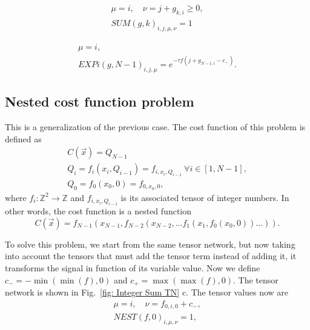 \begin{equation}
     \begin{gathered}
         \mu=i,\quad \nu=j+g_{k,i}\geq 0,\\
         SUM(g,k)_{i,j,\mu,\nu} = 1
     \end{gathered}
\end{equation}

\begin{equation}
     \begin{gathered}
         \mu=i,\\
         EXPi(g,N-1)_{i,j,\mu} = e^{-\tau f(j+g_{N-1,i}-c_-)}.
     \end{gathered}
\end{equation}


\subsection{Nested cost function problem}
This is a generalization of the previous case. The cost function of this problem is defined as
\begin{equation}
    \begin{gathered}
        C(\vec{x})=Q_{N-1}\\
        Q_i = f_i(x_i,Q_{i-1})=f_{i,x_i,Q_{i-1}}\ \forall i\in[1,N-1],\\
        Q_0 = f_0(x_0,0)=f_{0,x_0,0},
    \end{gathered}
\end{equation}
where $f_i: \mathbb{Z}^2\rightarrow \mathbb{Z}$ and $f_{i,x_i,Q_{i-1}}$ is its associated tensor of integer numbers. In other words, the cost function is a nested function
\begin{equation}
    C(\vec{x})=f_{N-1}(x_{N-1},f_{N-2}(x_{N-2},\dots f_{1}(x_{1},f_0(x_0,0))\dots)).
\end{equation}

To solve this problem, we start from the same tensor network, but now taking into account the tensors that must add the tensor term instead of adding it, it transforms the signal in function of its variable value. Now we define  $c_-=-\min(\min(f),0)$ and $c_+=\max(\max(f),0)$. The tensor network is shown in Fig.~\ref{fig: Integer Sum TN} c. The tensor values now are
\begin{equation}
     \begin{gathered}
         \mu=i,\quad \nu=f_{0,i,0}+c_-,\\
         NEST(f,0)_{i,\mu,\nu} = 1,
     \end{gathered}
\end{equation}

